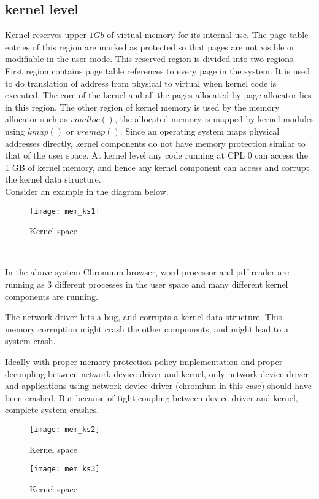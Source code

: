 \subsection{kernel level}

Kernel reserves upper $1Gb$ of virtual memory for its internal use. The page table entries of this region are marked as protected so that pages are not visible or modifiable in the user mode. This reserved region is divided into two regions. First region contains page table references to every page in the system. It is used to do translation of address from physical to virtual when kernel code is executed. The core of the kernel and all the pages allocated by page allocator lies in this region. The other region of kernel memory is used by the memory allocator such as $vmalloc()$, the allocated memory is mapped by kernel modules using $kmap()$ or $vremap()$. Since an operating system maps physical addresses directly, kernel components do not have memory protection similar to that of the user space. At kernel level any code running at CPL 0 can access the 1 GB of kernel memory, and hence any kernel component can access and corrupt the kernel data structure. 
\\
Consider an example in the diagram below.
\\
\begin{figure}[!ht]
\centering
\texttt{[image: mem\_ks1]}
\caption{Kernel space}
\label{fig:Kernel space}
\end{figure}
\\
\begin{description}
\item In the above system Chromium browser, word processor and pdf reader are running as 3 different processes in the user space and many different kernel components are running.
\item The network driver hits a bug, and corrupts a kernel data structure. This memory corruption might crash the other components, and might lead to a system crash.
\item Ideally with proper memory protection policy implementation and proper decoupling between network device driver and kernel, only network device driver and applications using network device driver (chromium in this case) should have been crashed. But because of tight coupling between device driver and kernel, complete system crashes.
\end{description}
\begin{figure}[!ht]
\centering
\texttt{[image: mem\_ks2]}
\caption{Kernel space}
\label{fig:Kernel space}
\end{figure}
\begin{figure}[!ht]
\centering
\texttt{[image: mem\_ks3]}
\caption{Kernel space}
\label{fig:Kernel space}
\end{figure}

